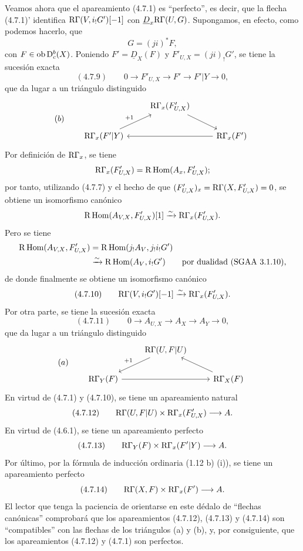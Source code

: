 Veamos ahora que el apareamiento (4.7.1) es \textquotedblleft perfecto\textquotedblright{}, es decir, que la flecha (4.7.1)' identifica $\mathrm{R}\Gamma(V,i_!G')[-1]$ con $\underline{D}_x\mathrm{R}\Gamma(U,G)$. Supongamos, en efecto, como podemos hacerlo, que
\[
G=(ji)^*F,
\]
con $F\in\operatorname{ob}\mathrm{D}_c^b(X)$. Poniendo $F'=\underline{D}_X(F)$ y $F'_{U,X}=(ji)_!G'$, se tiene la sucesión exacta
\[
(4.7.9)\qquad 0\longrightarrow F'_{U,X}\longrightarrow F'\longrightarrow F'|Y\longrightarrow0,
\]
que da lugar a un triángulo distinguido
\[
(b)\qquad
\begin{tikzcd}
& \R\Gamma_x(F'_{U,X}) \arrow[dr] \\
\R\Gamma_x(F'|Y) \arrow[ur,"{+1}"] && \R\Gamma_x(F') \arrow[ll]
\end{tikzcd}
\]
Por definición de $\mathrm{R}\Gamma_x$, se tiene
\[
\mathrm{R}\Gamma_x(F'_{U,X})=\mathrm{R}\operatorname{Hom}(A_x,F'_{U,X});
\]
por tanto, utilizando (4.7.7) y el hecho de que $(F'_{U,X})_x=\mathrm{R}\Gamma(X,F'_{U,X})=0$, se obtiene un isomorfismo canónico
\[
\mathrm{R}\operatorname{Hom}(A_{V,X},F'_{U,X})[1]\xrightarrow{\sim}\mathrm{R}\Gamma_x(F'_{U,X}).
\]
Pero se tiene
\[
\begin{aligned}
\mathrm{R}\operatorname{Hom}(A_{V,X},F'_{U,X})&=\mathrm{R}\operatorname{Hom}(j_!A_V,j_!i_!G')\\
&\xrightarrow{\sim}\mathrm{R}\operatorname{Hom}(A_V,i_!G')\qquad\text{por dualidad (SGAA~3.1.10)},
\end{aligned}
\]
de donde finalmente se obtiene un isomorfismo canónico
\[
(4.7.10)\qquad \mathrm{R}\Gamma(V,i_!G')[-1]\xrightarrow{\sim}\mathrm{R}\Gamma_x(F'_{U,X}).
\]
Por otra parte, se tiene la sucesión exacta
\[
(4.7.11)\qquad 0\longrightarrow A_{U,X}\longrightarrow A_X\longrightarrow A_Y\longrightarrow0,
\]
que da lugar a un triángulo distinguido
\[
(a)\qquad
\begin{tikzcd}
& \R\Gamma(U,F|U) \arrow[dl,"{+1}"'] \\
\R\Gamma_Y(F) \arrow[rr] && \R\Gamma_X(F) \arrow[ul]
\end{tikzcd}
\]
En virtud de (4.7.1) y (4.7.10), se tiene un apareamiento natural
\[
(4.7.12)\qquad \mathrm{R}\Gamma(U,F|U)\times\mathrm{R}\Gamma_x(F'_{U,X})\longrightarrow A.
\]
En virtud de (4.6.1), se tiene un apareamiento perfecto
\[
(4.7.13)\qquad \mathrm{R}\Gamma_Y(F)\times\mathrm{R}\Gamma_x(F'|Y)\longrightarrow A.
\]
Por último, por la fórmula de inducción ordinaria (1.12 b) (i)), se tiene un apareamiento perfecto
\[
(4.7.14)\qquad \mathrm{R}\Gamma(X,F)\times\mathrm{R}\Gamma_x(F')\longrightarrow A.
\]
El lector que tenga la paciencia de orientarse en este dédalo de \textquotedblleft flechas canónicas\textquotedblright{} comprobará que los apareamientos (4.7.12), (4.7.13) y (4.7.14) son \textquotedblleft compatibles\textquotedblright{} con las flechas de los triángulos (a) y (b), y, por consiguiente, que los apareamientos (4.7.12) y (4.7.1) son perfectos.

